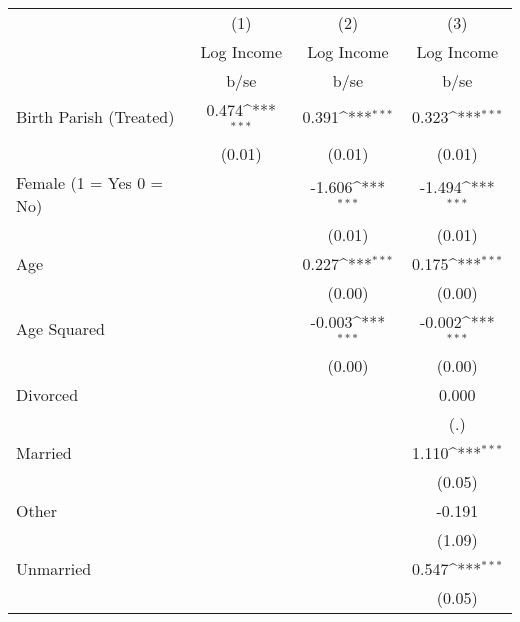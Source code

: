 {
\def\sym#1{\ifmmode^{#1}\else\(^{#1}\)\fi}
\begin{tabular}{l*{3}{c}}
\hline\hline
                    &\multicolumn{1}{c}{(1)}&\multicolumn{1}{c}{(2)}&\multicolumn{1}{c}{(3)}\\
                    &\multicolumn{1}{c}{Log Income}&\multicolumn{1}{c}{Log Income}&\multicolumn{1}{c}{Log Income}\\
                    &        b/se         &        b/se         &        b/se         \\
\hline
Birth Parish (Treated)&       0.474\sym{***}&       0.391\sym{***}&       0.323\sym{***}\\
                    &      (0.01)         &      (0.01)         &      (0.01)         \\
Female (1 = Yes 0 = No)&                     &      -1.606\sym{***}&      -1.494\sym{***}\\
                    &                     &      (0.01)         &      (0.01)         \\
Age                 &                     &       0.227\sym{***}&       0.175\sym{***}\\
                    &                     &      (0.00)         &      (0.00)         \\
Age Squared         &                     &      -0.003\sym{***}&      -0.002\sym{***}\\
                    &                     &      (0.00)         &      (0.00)         \\
Divorced            &                     &                     &       0.000         \\
                    &                     &                     &         (.)         \\
Married             &                     &                     &       1.110\sym{***}\\
                    &                     &                     &      (0.05)         \\
Other               &                     &                     &      -0.191         \\
                    &                     &                     &      (1.09)         \\
Unmarried           &                     &                     &       0.547\sym{***}\\
                    &                     &                     &      (0.05)         \\

\end{tabular}}
